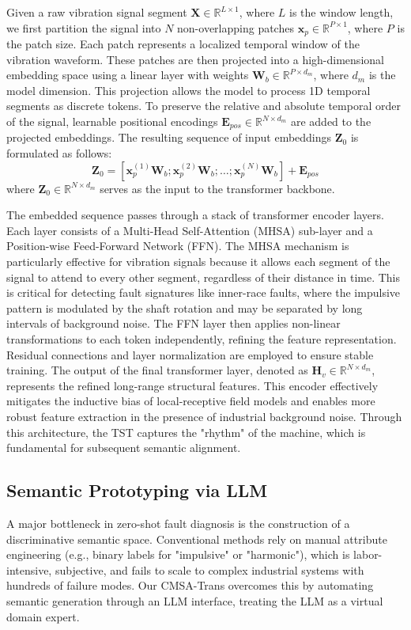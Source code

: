 \documentclass[journal]{IEEEtran}
\begin{document}
Given a raw vibration signal segment $\mathbf{X} \in \mathbb{R}^{L \times 1}$, where $L$ is the window length, we first partition the signal into $N$ non-overlapping patches $\mathbf{x}_p \in \mathbb{R}^{P \times 1}$, where $P$ is the patch size. Each patch represents a localized temporal window of the vibration waveform. These patches are then projected into a high-dimensional embedding space using a linear layer with weights $\mathbf{W}_b \in \mathbb{R}^{P \times d_m}$, where $d_m$ is the model dimension. This projection allows the model to process 1D temporal segments as discrete tokens. To preserve the relative and absolute temporal order of the signal, learnable positional encodings $\mathbf{E}_{pos} \in \mathbb{R}^{N \times d_m}$ are added to the projected embeddings. The resulting sequence of input embeddings $\mathbf{Z}_0$ is formulated as follows:
\begin{equation}
\mathbf{Z}_0 = [\mathbf{x}_p^{(1)}\mathbf{W}_b; \mathbf{x}_p^{(2)}\mathbf{W}_b; \dots; \mathbf{x}_p^{(N)}\mathbf{W}_b] + \mathbf{E}_{pos}
\end{equation}
where $\mathbf{Z}_0 \in \mathbb{R}^{N \times d_m}$ serves as the input to the transformer backbone.

The embedded sequence passes through a stack of transformer encoder layers. Each layer consists of a Multi-Head Self-Attention (MHSA) sub-layer and a Position-wise Feed-Forward Network (FFN). The MHSA mechanism is particularly effective for vibration signals because it allows each segment of the signal to attend to every other segment, regardless of their distance in time. This is critical for detecting fault signatures like inner-race faults, where the impulsive pattern is modulated by the shaft rotation and may be separated by long intervals of background noise. The FFN layer then applies non-linear transformations to each token independently, refining the feature representation. Residual connections and layer normalization are employed to ensure stable training. The output of the final transformer layer, denoted as $\mathbf{H}_v \in \mathbb{R}^{N \times d_m}$, represents the refined long-range structural features. This encoder effectively mitigates the inductive bias of local-receptive field models and enables more robust feature extraction in the presence of industrial background noise. Through this architecture, the TST captures the "rhythm" of the machine, which is fundamental for subsequent semantic alignment.

\subsection{Semantic Prototyping via LLM}
A major bottleneck in zero-shot fault diagnosis is the construction of a discriminative semantic space. Conventional methods rely on manual attribute engineering (e.g., binary labels for "impulsive" or "harmonic"), which is labor-intensive, subjective, and fails to scale to complex industrial systems with hundreds of failure modes. Our CMSA-Trans overcomes this by automating semantic generation through an LLM interface, treating the LLM as a virtual domain expert.
\end{document}
